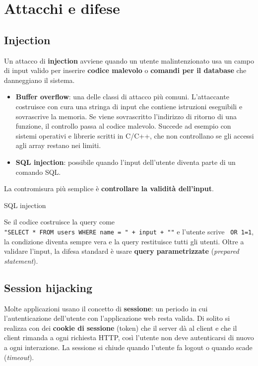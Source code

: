 \section{Attacchi e difese}\label{attacchi-e-difese}

\subsection{Injection}\label{injection}

Un attacco di \textbf{injection} avviene quando un utente
malintenzionato usa un campo di input valido per inserire \textbf{codice
malevolo} o \textbf{comandi per il database} che danneggiano il sistema.

\begin{itemize}
\tightlist
\item
  \textbf{Buffer overflow}: una delle classi di attacco più comuni.
  L'attaccante costruisce con cura una stringa di input che contiene
  istruzioni eseguibili e sovrascrive la memoria. Se viene sovrascritto
  l'indirizzo di ritorno di una funzione, il controllo passa al codice
  malevolo. Succede ad esempio con sistemi operativi e librerie scritti
  in C/C++, che non controllano se gli accessi agli array restano nei
  limiti.
\item
  \textbf{SQL injection}: possibile quando l'input dell'utente diventa
  parte di un comando SQL.
\end{itemize}

La contromisura più semplice è \textbf{controllare la validità
dell'input}.

\begin{boxexample}{SQL injection}

Se il codice costruisce la query come
\texttt{"SELECT\ *\ FROM\ users\ WHERE\ name\ =\ \textquotesingle{}"\ +\ input\ +\ "\textquotesingle{}"}
e l'utente scrive
\texttt{\textquotesingle{}\ OR\ \textquotesingle{}1\textquotesingle{}=\textquotesingle{}1},
la condizione diventa sempre vera e la query restituisce tutti gli
utenti. Oltre a validare l'input, la difesa standard è usare
\textbf{query parametrizzate} (\emph{prepared statement}).

\end{boxexample}

\subsection{Session hijacking}\label{session-hijacking}

Molte applicazioni usano il concetto di \textbf{sessione}: un periodo in
cui l'autenticazione dell'utente con l'applicazione web resta valida. Di
solito si realizza con dei \textbf{cookie di sessione} (token) che il
server dà al client e che il client rimanda a ogni richiesta HTTP, così
l'utente non deve autenticarsi di nuovo a ogni interazione. La sessione
si chiude quando l'utente fa logout o quando scade (\emph{timeout}).

